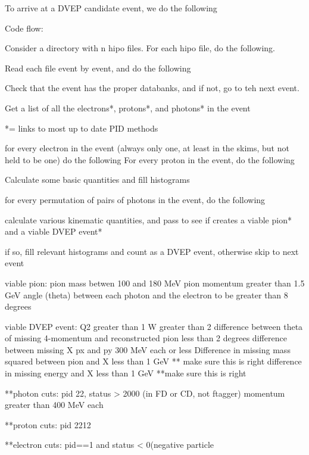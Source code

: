 To arrive at a DVEP candidate event, we do the following


Code flow:

Consider a directory with n hipo files. For each hipo file, do the following.

Read each file event by event, and do the following

Check that the event has the proper databanks, and if not, go to teh next event.

Get a list of all the electrons*, protons*, and photons* in the event

*= links to most up to date PID methods

for every electron in the event (always only one, at least in the skims, but not held to be one) do the following
For every proton in the event, do the following

Calculate some basic quantities and fill histograms

for every permutation of pairs of photons in the event, do the following

calculate various kinematic quantities, and pass to see if creates a viable pion* and a viable DVEP event*

if so, fill relevant histograms and count as a DVEP event, otherwise skip to next event

viable pion: 
pion mass betwen 100 and 180 MeV
pion momentum greater than 1.5 GeV
angle (theta) between each photon and the electron to be greater than 8 degrees

viable DVEP event:
Q2 greater than 1
W greater than 2
difference between theta of missing 4-momentum and reconstructed pion less than 2 degrees
difference between missing X px and py 300 MeV each or less
Difference in missing mass squared between pion and X less than 1 GeV ** make sure this is right
difference in missing energy and X less than 1 GeV **make sure this is right

**photon cuts:
pid 22, status > 2000 (in FD or CD, not ftagger)
momentum greater than 400 MeV each

**proton cuts: pid 2212

**electron cuts: pid==1 and status < 0(negative particle


